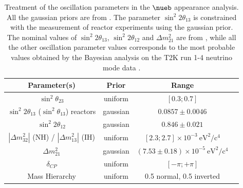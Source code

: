 \begin{table}
	\centering
	\begin{tabular}{| c | c | c | c |}
 	\hline
Parameter(s)													& Prior		& Range     												\\
\hline
$\sin^{2}\theta_{23}$											&  uniform 	& $[0.3; 0.7]$     							 				\\
$\sin^{2} 2 \theta_{13}$ ($\sin^{2} \theta_{13}$) reactors		&  gaussian & $0.0857 \pm 0.0046$ 										\\
$\sin^{2} 2 \theta_{12}$  										&  gaussian & $0.846 \pm 0.021$ 										\\
$|\Delta m^{2}_{32}|$ (NH) / $|\Delta m^{2}_{13}|$ (IH)      	&  uniform	& $ [2.3; 2.7] \times 10^{-3}~\mbox{eV}^2/\mbox{c}^4$	    \\
$\Delta m^{2}_{21}$      										&  gaussian & $(7.53 \pm 0.18) \times 10^{-5}~\mbox{eV}^2/\mbox{c}^4$	\\
$\delta_{CP}$                                               	&  uniform 	& $[-\pi; +\pi]$ 											\\
Mass Hierarchy													&  uniform 	& 0.5 normal, 0.5 inverted 									\\  
\hline
\end{tabular}
\caption{
Treatment of the oscillation parameters in the $\nueb$ appearance analysis. All the gaussian priors are from \cite{pdg_2014}. The parameter $\sin^{2} 2 \theta_{13}$ is constrained with the measurement of reactor experiments using the gaussian prior. The nominal values of $\sin^2 2 \theta_{13}$, $\sin^2 2 \theta_{12}$ and $\Delta m^2_{21}$ are from \cite{pdg_2014}, while all the other oscillation parameter values corresponds to the most probable values obtained by the Bayesian analysis on the T2K run 1-4 neutrino mode data \cite{T2KLongPaper}.
}
\label{tab:osc_param_priors_nuebarapp}
\end{table}
